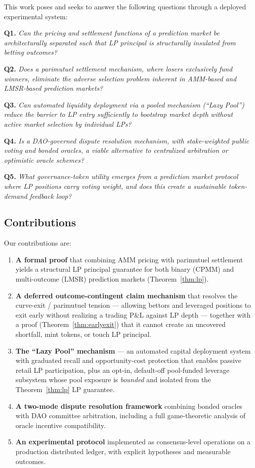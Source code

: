 \documentclass{ledger}
\theoremstyle{plain}
\theoremstyle{remark}
\begin{document}
This work poses and seeks to answer the following questions through a deployed
experimental system:

\textbf{Q1.} \emph{Can the pricing and settlement functions of a prediction
market be architecturally separated such that LP principal is structurally
insulated from betting outcomes?}

\textbf{Q2.} \emph{Does a parimutuel settlement mechanism, where losers
exclusively fund winners, eliminate the adverse selection problem inherent in
AMM-based and LMSR-based prediction markets?}

\textbf{Q3.} \emph{Can automated liquidity deployment via a pooled mechanism
(``Lazy Pool'') reduce the barrier to LP entry sufficiently to bootstrap market
depth without active market selection by individual LPs?}

\textbf{Q4.} \emph{Is a DAO-governed dispute resolution mechanism, with
stake-weighted public voting and bonded oracles, a viable alternative to
centralized arbitration or optimistic oracle schemes?}

\textbf{Q5.} \emph{What governance-token utility emerges from a prediction
market protocol where LP positions carry voting weight, and does this create a
sustainable token-demand feedback loop?}

\subsection{Contributions}

Our contributions are:

\begin{enumerate}
  \item \textbf{A formal proof} that combining AMM pricing with parimutuel
  settlement yields a structural LP principal guarantee for both binary (CPMM)
  and multi-outcome (LMSR) prediction markets (Theorem~\ref{thm:lp}).
  \item \textbf{A deferred outcome-contingent claim mechanism} that resolves the
  curve-exit / parimutuel tension --- allowing bettors and leveraged positions
  to exit early without realizing a trading P\&L against LP depth --- together
  with a proof (Theorem~\ref{thm:earlyexit}) that it cannot create an uncovered
  shortfall, mint tokens, or touch LP principal.
  \item \textbf{The ``Lazy Pool'' mechanism} --- an automated capital deployment
  system with graduated recall and opportunity-cost protection that enables
  passive retail LP participation, plus an opt-in, default-off pool-funded
  leverage subsystem whose pool exposure is \emph{bounded} and isolated from the
  Theorem~\ref{thm:lp} LP guarantee.
  \item \textbf{A two-mode dispute resolution framework} combining bonded
  oracles with DAO committee arbitration, including a full game-theoretic
  analysis of oracle incentive compatibility.
  \item \textbf{An experimental protocol} implemented as consensus-level
  operations on a production distributed ledger, with explicit hypotheses and
  measurable outcomes.
\end{enumerate}
\end{document}
